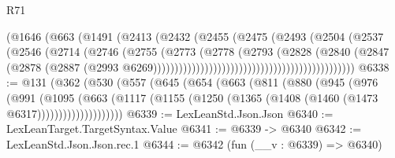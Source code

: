 \begin{lexlean}{R71}
\begin{coremodule}
                                                    (@1646
                                                      (@663
                                                        (@1491
                                                          (@2413
                                                            (@2432
                                                              (@2455
                                                                (@2475
                                                                  (@2493
                                                                    (@2504
                                                                      (@2537
                                                                        (@2546
                                                                          (@2714
                                                                            (@2746
                                                                              (@2755
                                                                                (@2773
                                                                                  (@2778
                                                                                    (@2793
                                                                                      (@2828
                                                                                        (@2840
                                                                                          (@2847
                                                                                            (@2878
                                                                                              (@2887
                                                                                                (@2993
                                                                                                  @6269)))))))))))))))))))))))))))))))))))))))))))))))
@6338 := @131
    (@362
      (@530
        (@557
          (@645
            (@654
              (@663
                (@811
                  (@880
                    (@945
                      (@976
                        (@991
                          (@1095
                            (@663
                              (@1117
                                (@1155 (@1250 (@1365 (@1408 (@1460 (@1473 @6317))))))))))))))))))))
@6339 := LexLeanStd.Json.Json
@6340 := LexLeanTarget.TargetSyntax.Value
@6341 := @6339 -> @6340
@6342 := LexLeanStd.Json.Json.rec.{1}
@6344 := @6342 (fun (__v : @6339) => @6340)

\end{coremodule}
\end{lexlean}
